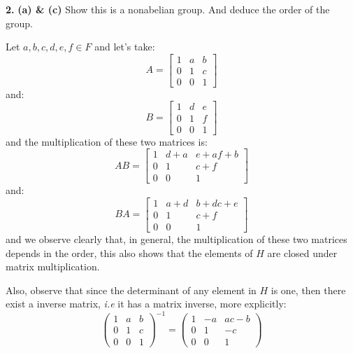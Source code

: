 \documentclass[notitlepage]{report}
\begin{document}
\textbf{2.} 
\textbf{(a) \& (c)} Show this is a nonabelian group. And deduce the order of the group.
\begin{mdframed}[]
	Let $a,b,c,d,e,f \in F$ and let's take: 
	\[ A = \begin{bmatrix}
	1 & a & b \\
	0 & 1 & c \\
	0 & 0 & 1
	\end{bmatrix} \]
	and:
	\[ B = \begin{bmatrix}
		1 & d & e \\
		0 & 1 & f \\
		0 & 0 & 1
	\end{bmatrix} \]
	and the multiplication of these two matrices is:
	\[ AB = \begin{bmatrix}
	1 & d+a & e + af + b \\
	0 & 1 & c + f \\
	0 & 0 & 1
	\end{bmatrix} \]
	and:
	 \[ BA= \begin{bmatrix}
	 1 & a+d & b+dc +e \\
	 0 & 1 & c+f \\
	 0 & 0 & 1
	 \end{bmatrix} \]
	 and we observe clearly that, in general, the multiplication of these two matrices depends in the order, this also shows that the elements of $H$ are closed under matrix multiplication.
	 
	 Also, observe that since the determinant of any element in $H$ is one, then there exist a inverse matrix, \emph{i.e} it has a matrix inverse, more explicitly:
	 \[ 
	 \begin{pmatrix}
	    1&a&b  \\ 
	    0&1&c \\    
	    0&0&1
	 \end{pmatrix}^{-1} =
	 \begin{pmatrix}
	 1 & -a & ac-b \\
	 0 & 1 & -c \\
	 0 & 0 & 1
	 \end{pmatrix} \]
	 

\end{mdframed}
\end{document}

